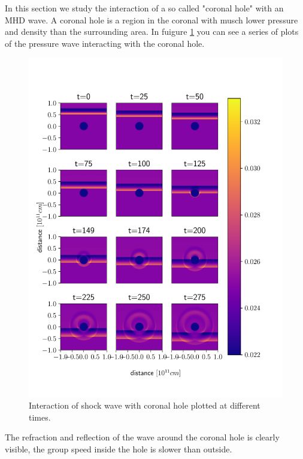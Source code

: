 In this section we study the interaction of a so called "coronal hole" with an MHD wave. 
A coronal hole is a region in the coronal with musch lower pressure and density than the surrounding area.
In fuigure \cref{fig:coronal-hole} you can see a series of plots of the pressure wave interacting with the coronal hole.

\begin{figure}[H]
	\centering
	\includegraphics[width=\linewidth]{images/coronal-hole.pdf}
	\caption{Interaction of shock wave with coronal hole plotted at different times.}
	\label{fig:coronal-hole}
\end{figure}

The refraction and reflection of the wave around the coronal hole is clearly visible, the group speed inside the hole is slower than outside.

